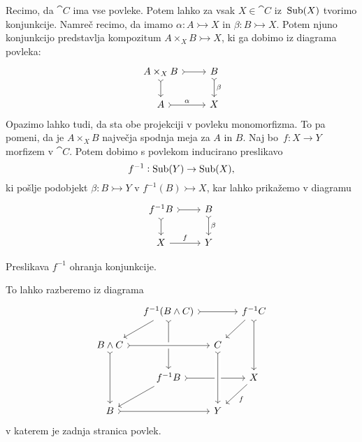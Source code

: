 \documentclass[../kategoricna_logika.tex]{subfiles}
\begin{document}
Recimo, da $\cat{C}$ ima vse povleke.  Potem lahko za vsak
$X \in \cat{C}$ iz~$\operatorname{Sub}(X)$ tvorimo konjunkcije.  Namreč
recimo, da imamo $\alpha : A \rightarrowtail X$ in
${\beta : B \rightarrowtail X}$.  Potem njuno konjunkcijo predstavlja
kompozitum $A \times_X B \rightarrowtail X$, ki ga dobimo iz diagrama
povleka:
\begin{equation*}
  \begin{tikzcd}
    A \times_X B \ar[r, tail] \ar[d, tail] & B \ar[d, tail, "\beta"] \\
    A \ar[r, tail, "\alpha"] & X
  \end{tikzcd}
\end{equation*}
Opazimo lahko tudi, da sta obe projekciji v povleku monomorfizma.
To pa pomeni, da je $A \times_X B$ največja spodnja meja za $A$ in $B$.
Naj bo~$f : X \to Y$ morfizem v $\cat{C}$.  Potem dobimo s povlekom
inducirano preslikavo
$$f^{-1} : \operatorname{Sub}(Y) \to \operatorname{Sub}(X),$$
ki pošlje podobjekt $\beta : B \rightarrowtail Y$ v
$f^{-1}(B) \rightarrowtail X$, kar lahko prikažemo v diagramu
\begin{equation*}
  \begin{tikzcd}
    f^{-1}B \ar[r, tail] \ar[d, tail] & B \ar[d, tail, "\beta"] \\
    X \ar[r, "f"] & Y
  \end{tikzcd}
\end{equation*}
\begin{lema}
  Preslikava $f^{-1}$ ohranja konjunkcije.
\end{lema}
\begin{dokaz}
  To lahko razberemo iz diagrama
  \begin{equation*}
    \begin{tikzcd}[column sep=small, row sep=normal]
      & f^{-1}(B \land C) \ar[dl] \ar[dd, tail] \ar[rr, tail] & & f^{-1}C \ar[dl] \ar[dd, tail] \\
      B \land C \ar[dd, tail] \ar[rr, crossing over, tail] & & C  & \\
      & f^{-1}B \ar[dl] \ar[rr, tail] & & X \ar[dl, "f"] \\
      B \ar[rr, tail] & & Y \ar[from=uu, crossing over, tail] &
    \end{tikzcd}
  \end{equation*}
  v katerem je zadnja stranica povlek.
\end{dokaz}
\end{document}
